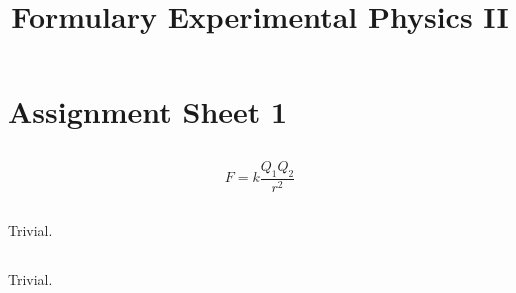 \documentclass{report}
\title{Formulary Experimental Physics II}
\begin{document}
\chapter{Assignment Sheet 1}

\section{}

\section{}
$$F=k\frac{Q_1 Q_2}{r^2}$$

\section{}

\section{}
Trivial.

\section{}
Trivial.
\end{document}
